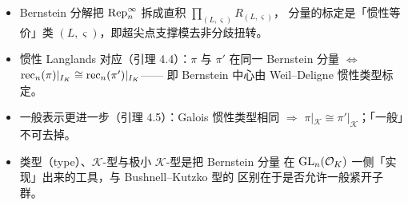 \begin{keytakeaways}
\begin{itemize}[leftmargin=1.5em]
\item Bernstein 分解把 $\mathrm{Rep}^{\infty}_n$ 拆成直积 $\prod_{(L,\varsigma)}R_{(L,\varsigma)}$，
      分量的标定是「惯性等价」类 $(L,\varsigma)$，即超尖点支撑模去非分歧扭转。
\item 惯性 Langlands 对应（引理 4.4）：$\pi$ 与 $\pi'$ 在同一 Bernstein 分量
      $\Leftrightarrow$ $\mathrm{rec}_n(\pi)|_{I_K}\cong\mathrm{rec}_n(\pi')|_{I_K}$——
      即 Bernstein 中心由 Weil--Deligne 惯性类型标定。
\item 一般表示更进一步（引理 4.5）：Galois 惯性类型相同 $\Rightarrow$
      $\pi|_{\mathcal{K}}\cong\pi'|_{\mathcal{K}}$；「一般」不可去掉。
\item 类型（type）、$\mathcal{K}$-型与极小 $\mathcal{K}$-型是把 Bernstein 分量
      在 $\mathrm{GL}_n(\mathcal{O}_K)$ 一侧「实现」出来的工具，与 Bushnell--Kutzko 型的
      区别在于是否允许一般紧开子群。
\end{itemize}
\end{keytakeaways}
